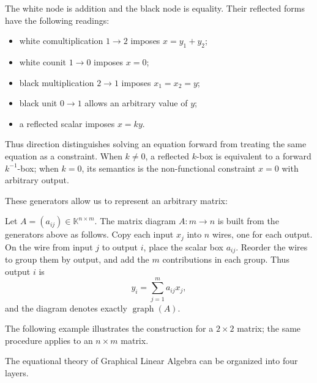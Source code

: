 The white node is addition and the black node is equality.  Their reflected
forms have the following readings:
\begin{itemize}
    \item white comultiplication $1\to2$ imposes $x=y_1+y_2$;
    \item white counit $1\to0$ imposes $x=0$;
    \item black multiplication $2\to1$ imposes $x_1=x_2=y$;
    \item black unit $0\to1$ allows an arbitrary value of $y$;
    \item a reflected scalar imposes $x=ky$.
\end{itemize}
Thus direction distinguishes solving an equation forward from treating the
same equation as a constraint.  When $k\ne0$, a reflected $k$-box is equivalent
to a forward $k^{-1}$-box; when $k=0$, its semantics is the non-functional
constraint $x=0$ with arbitrary output.

These generators allow us to represent an arbitrary matrix:

\begin{definition}
Let $A=(a_{ij})\in\mathbb K^{n\times m}$. The matrix diagram
$A:m\to n$ is built from the generators above as follows. Copy each input
$x_j$ into $n$ wires, one for each output. On the wire from input $j$ to
output $i$, place the scalar box $a_{ij}$. Reorder the wires to group them
by output, and add the $m$ contributions in each group. Thus output $i$ is
\[
 y_i=\sum_{j=1}^{m}a_{ij}x_j,
\]
and the diagram denotes exactly $\operatorname{graph}(A)$.

The following example illustrates the construction for a $2\times2$ matrix;
the same procedure applies to an $n\times m$ matrix.

\centering


\end{definition}

The equational theory of Graphical Linear Algebra can be organized into four layers.

